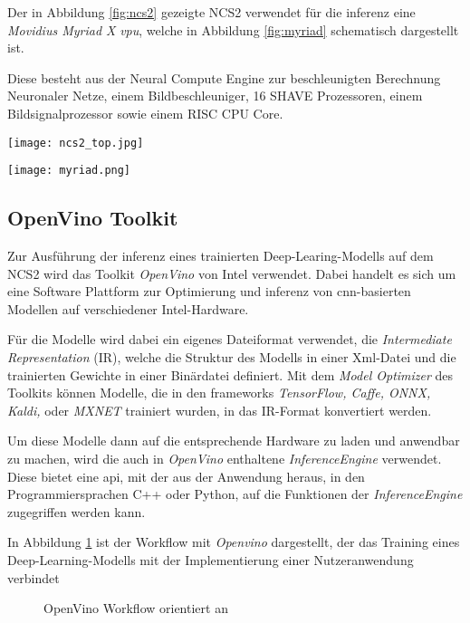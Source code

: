 Der in Abbildung \ref{fig:ncs2} gezeigte NCS2
verwendet für die \Gls{inferenz} eine
\textit{Movidius Myriad X} \textit{\Gls{vpu}},
welche in Abbildung \ref{fig:myriad} schematisch 
dargestellt ist.

Diese besteht aus der Neural Compute Engine 
zur beschleunigten Berechnung Neuronaler Netze,
einem Bildbeschleuniger, 16 SHAVE Prozessoren, einem 
Bildsignalprozessor sowie einem RISC CPU Core. 
\cite{haussermann}

\vspace{1cm}
\begin{minipage}{0.4\textwidth}
    \centering
    \texttt{[image: ncs2\_top.jpg]}
    \label{fig:ncs2}
\end{minipage}
\begin{minipage}{0.6\textwidth}
    \centering
    \texttt{[image: myriad.png]}
    \label{fig:myriad}
\end{minipage}


\subsection{OpenVino Toolkit}

Zur Ausführung der \Gls{inferenz} eines trainierten Deep-Learing-Modells
auf dem NCS2 wird das Toolkit 
\textit{OpenVino} von Intel verwendet.
Dabei handelt es sich um eine Software Plattform
zur Optimierung und \Gls{inferenz} 
von \Gls{cnn}-basierten Modellen auf verschiedener
Intel-Hardware.

Für die Modelle wird dabei ein eigenes Dateiformat verwendet, 
die \textit{Intermediate Representation} (IR),
welche die Struktur des Modells 
in einer Xml-Datei und die trainierten Gewichte in 
einer Binärdatei definiert.
Mit dem \textit{Model Optimizer} des Toolkits
können Modelle, die in den \Glspl{framework}
 \textit{TensorFlow,
Caffe, ONNX, Kaldi,} oder \textit{MXNET} trainiert wurden, 
in das IR-Format konvertiert werden.


Um diese Modelle dann auf die entsprechende Hardware
zu laden und anwendbar zu machen, wird die auch
in \textit{OpenVino} enthaltene
\textit{InferenceEngine} verwendet.
Diese bietet eine \Gls{api}, mit der aus der Anwendung
heraus, in den Programmiersprachen C++ oder Python,
auf die Funktionen der 
\textit{InferenceEngine} zugegriffen werden kann.


In Abbildung \ref{fig:openvinoflow} ist der Workflow mit 
\textit{Openvino} dargestellt, der das Training eines
Deep-Learning-Modells mit der Implementierung
einer Nutzeranwendung verbindet


\vspace{1cm}
\begin{figure}[H]
    \centering
    \def\svgwidth{0.8\textwidth}
    
    \caption{OpenVino Workflow orientiert an 
    \cite{openvinoflow}}
    \label{fig:openvinoflow}
\end{figure}
